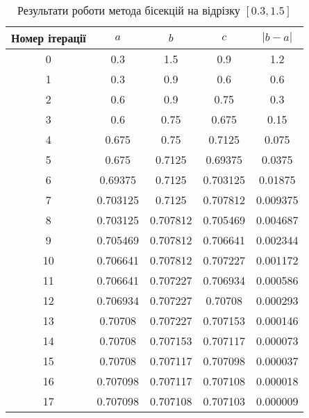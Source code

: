 \begin{table}[h!]
    \centering
    \begin{tabular}{|c|c|c|c|c|}
        \hline
        \textbf{Номер ітерації} & $a$ & $b$ & $c$ & $|b-a|$ \\
        \hline
        0 & 0.3 & 1.5 & 0.9 & 1.2 \\
        \hline
        1 & 0.3 & 0.9 & 0.6 & 0.6 \\
        \hline
        2 & 0.6 & 0.9 & 0.75 & 0.3 \\
        \hline
        3 & 0.6 & 0.75 & 0.675 & 0.15 \\
        \hline
        4 & 0.675 & 0.75 & 0.7125 & 0.075 \\
        \hline
        5 & 0.675 & 0.7125 & 0.69375 & 0.0375 \\
        \hline
        6 & 0.69375 & 0.7125 & 0.703125 & 0.01875 \\
        \hline
        7 & 0.703125 & 0.7125 & 0.707812 & 0.009375 \\
        \hline
        8 & 0.703125 & 0.707812 & 0.705469 & 0.004687 \\
        \hline
        9 & 0.705469 & 0.707812 & 0.706641 & 0.002344 \\
        \hline
        10 & 0.706641 & 0.707812 & 0.707227 & 0.001172 \\
        \hline
        11 & 0.706641 & 0.707227 & 0.706934 & 0.000586 \\
        \hline
        12 & 0.706934 & 0.707227 & 0.70708 & 0.000293 \\
        \hline
        13 & 0.70708 & 0.707227 & 0.707153 & 0.000146 \\
        \hline
        14 & 0.70708 & 0.707153 & 0.707117 & 0.000073 \\
        \hline
        15 & 0.70708 & 0.707117 & 0.707098 & 0.000037 \\
        \hline
        16 & 0.707098 & 0.707117 & 0.707108 & 0.000018 \\
        \hline
        17 & 0.707098 & 0.707108 & 0.707103 & 0.000009 \\
        \hline
    \end{tabular}
    \caption{Результати роботи метода бісекцій на відрізку $[0.3, 1.5]$}
\end{table}

